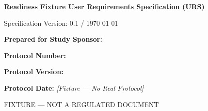 
\thispagestyle{empty}

\vspace*{2cm}

\begin{center}
  {\Huge\bfseries Readiness Fixture User Requirements Specification (URS)\par}
  \vspace{1.5cm}
  {\Large Specification Version: 0.1 / \today\par}
\end{center}

\vspace{4cm}

\noindent\textbf{Prepared for Study Sponsor:} \sponsorName\par
\vspace{0.5em}
\noindent\textbf{Protocol Number:} \protocolNumber\par
\vspace{0.5em}
\noindent\textbf{Protocol Version:} \protocolVersion\par
\vspace{0.5em}
\noindent\textbf{Protocol Date:} \textit{[Fixture — No Real Protocol]}\par

\vfill

\begin{center}
  \small FIXTURE — NOT A REGULATED DOCUMENT\par
\end{center}
